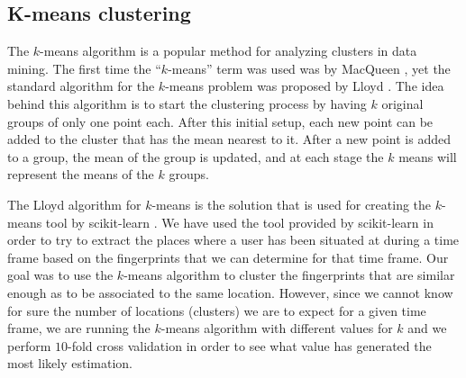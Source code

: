 \subsection{K-means clustering}
\label{k-means}

The $k$-means algorithm is a popular method for analyzing clusters in data
mining. The first time the ``$k$-means'' term was used was by MacQueen
\cite{Macqueen67somemethods}, yet the standard algorithm for the $k$-means
problem was proposed by Lloyd \cite{Lloyd:2006:LSQ:2263356.2269955}. The idea
behind this algorithm is to start the clustering process by having $k$ original
groups of only one point each. After this initial setup, each new point can be
added to the cluster that has the mean nearest to it. After a new point is added
to a group, the mean of the group is updated, and at each stage the $k$ means
will represent the means of the $k$ groups.

The Lloyd algorithm for $k$-means is the solution that is used for creating the
$k$-means tool by scikit-learn \cite{SL}. We have used the tool provided by
scikit-learn in order to try to extract the places where a user has been
situated at during a time frame based on the fingerprints that we can determine
for that time frame. Our goal was to use the $k$-means algorithm to cluster the
fingerprints that are similar enough as to be associated to the same location.
However, since we cannot know for sure the number of locations (clusters) we are
to expect for a given time frame, we are running the $k$-means algorithm with
different values for $k$ and we perform $10$-fold cross validation in order to
see what value has generated the most likely estimation.

